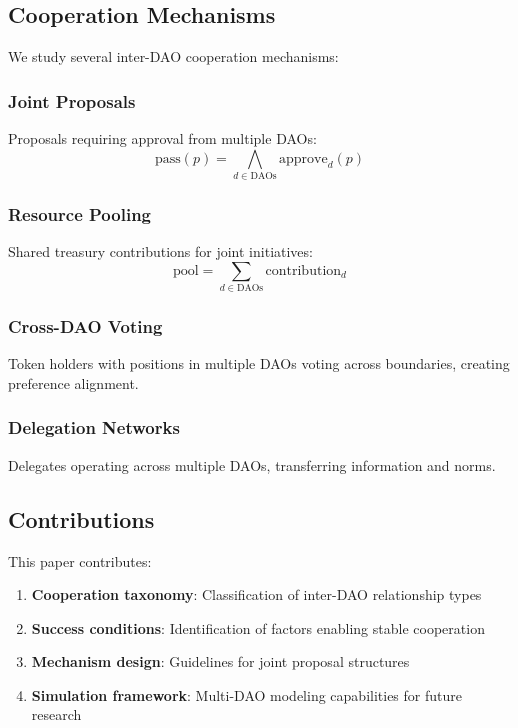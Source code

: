 \subsection{Cooperation Mechanisms}

We study several inter-DAO cooperation mechanisms:

\subsubsection{Joint Proposals}

Proposals requiring approval from multiple DAOs:
\begin{equation}
\text{pass}(p) = \bigwedge_{d \in \text{DAOs}} \text{approve}_d(p)
\end{equation}

\subsubsection{Resource Pooling}

Shared treasury contributions for joint initiatives:
\begin{equation}
\text{pool} = \sum_{d \in \text{DAOs}} \text{contribution}_d
\end{equation}

\subsubsection{Cross-DAO Voting}

Token holders with positions in multiple DAOs voting across boundaries, creating preference alignment.

\subsubsection{Delegation Networks}

Delegates operating across multiple DAOs, transferring information and norms.

\subsection{Contributions}

This paper contributes:

\begin{enumerate}
    \item \textbf{Cooperation taxonomy}: Classification of inter-DAO relationship types
    \item \textbf{Success conditions}: Identification of factors enabling stable cooperation
    \item \textbf{Mechanism design}: Guidelines for joint proposal structures
    \item \textbf{Simulation framework}: Multi-DAO modeling capabilities for future research
\end{enumerate}

